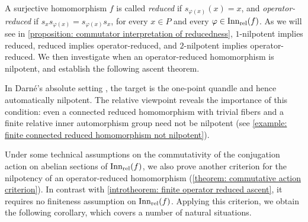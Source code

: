 A surjective homomorphism $f$ is called \emph{reduced} if $s_{\varphi(x)}(x)=x$, and \emph{operator-reduced} if $s_xs_{\varphi(x)}=s_{\varphi(x)}s_x$, for every $x\in P$ and every $\varphi\in\operatorname{Inn_{rel}}(f)$.
As we will see in \cref{proposition: commutator interpretation of reducedness}, $1$-nilpotent implies reduced, reduced implies operator-reduced, and $2$-nilpotent implies operator-reduced.
We then investigate when an operator-reduced homomorphism is nilpotent, and establish the following ascent theorem.

In Darn\'e's absolute setting \cite[Proposition 7.13]{darne_2026_nilpotent_quandles}, the target is the one-point quandle and hence automatically nilpotent. 
The relative viewpoint reveals the importance of this condition: even a connected reduced homomorphism with trivial fibers and a finite relative inner automorphism group need not be nilpotent (see \cref{example: finite connected reduced homomorphism not nilpotent}).

Under some technical assumptions on the commutativity of the conjugation action on abelian sections of $\operatorname{Inn_{rel}}(f)$, we also prove another criterion for the nilpotency of an operator-reduced homomorphism (\cref{theorem: commutative action criterion}).
In contrast with \cref{introtheorem: finite operator reduced ascent}, it requires no finiteness assumption on $\operatorname{Inn_{rel}}(f)$.
Applying this criterion, we obtain the following corollary, which covers a number of natural situations.



